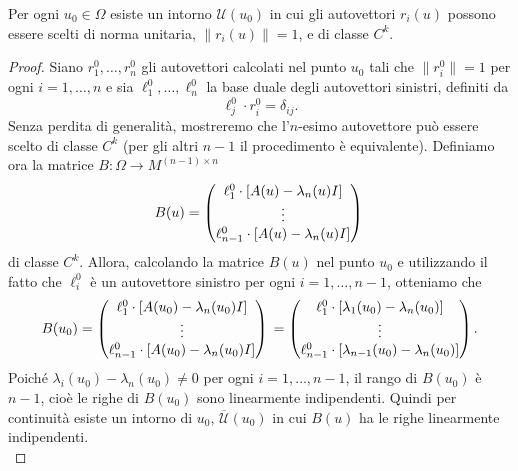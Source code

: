 \begin{teorema}
    Per ogni $u_{0}\in\Omega$ esiste un intorno $\mathcal{U}(u_{0})$ in cui gli autovettori $r_{i}(u)$ possono essere scelti  di norma unitaria, $\|r_{i}(u)\|=1$, e di classe $C^{k}$.
\end{teorema}
\begin{proof}
    Siano $r^{0}_{1},\ldots,r^{0}_{n}$ gli autovettori calcolati nel punto $u_{0}$ tali che $\|r^{0}_{i}\|=1$  per ogni $i=1,\ldots,n$ e sia $\ell^{0}_{1},\ldots,\ell^{0}_{n}$ la base duale degli autovettori sinistri, definiti da
    \begin{equation*}
        \ell^{0}_{j}\cdot r^{0}_{i} = \delta_{ij}.
    \end{equation*}
    Senza perdita di generalità, mostreremo che l'$n$-esimo autovettore può essere scelto di classe $C^{k}$ (per gli altri $n-1$ il procedimento è equivalente).
    Definiamo ora la matrice $B\colon\Omega\rightarrow M^{(n-1)\times n}$ 
    \begin{equation*}
        B(u) =
        \begin{pmatrix}\ell^{0}_{1}\cdot[A(u)-\lambda_{n}(u)I] \\ \vdots \\ \ell^{0}_{n-1}\cdot[A(u)-\lambda_{n}(u)I]\end{pmatrix}\\
    \end{equation*}
    di classe $C^{k}$. Allora, calcolando la matrice $B(u)$ nel punto $u_{0}$ e utilizzando il fatto che $\ell^{0}_{i}$ è un autovettore sinistro per ogni $i=1,\ldots,n-1$, otteniamo che
    \begin{equation*}
        B(u_{0}) =
        \begin{pmatrix}\ell^{0}_{1}\cdot[A(u_{0})-\lambda_{n}(u_{0})I] \\ \vdots \\ \ell^{0}_{n-1}\cdot[A(u_{0})-\lambda_{n}(u_{0})I]\end{pmatrix}\\ = 
        \begin{pmatrix}\ell^{0}_{1}\cdot[\lambda_{1}(u_{0})-\lambda_{n}(u_{0})] \\ \vdots \\ \ell^{0}_{n-1}\cdot[\lambda_{n-1}(u_{0})-\lambda_{n}(u_{0})]\end{pmatrix}\\.
    \end{equation*}
    Poiché $\lambda_{i}(u_{0})-\lambda_{n}(u_{0})\neq 0$ per ogni $i = 1,\ldots,n-1$, il rango di $B(u_{0})$ è $n-1$, cioè le righe di $B(u_{0})$ sono linearmente indipendenti. Quindi per continuità esiste un intorno di $u_{0}$, $\overline{\mathcal{U}}(u_{0})$ in cui $B(u)$ ha le righe linearmente indipendenti.\\

\end{proof}
